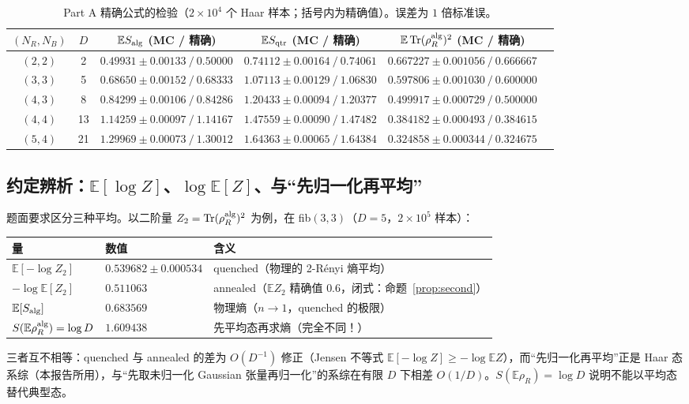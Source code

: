 \documentclass[11pt,a4paper]{ctexart}
\theoremstyle{definition}
\newcommand{\Tr}{\operatorname{Tr}}
\newcommand{\E}{\mathbb{E}}
\newcommand{\Nalg}{S_{\rm alg}}
\newcommand{\Nqtr}{S_{\rm qtr}}
\begin{document}
\begin{table}[t]\centering
\caption{Part A 精确公式的检验（$2\times10^4$ 个 Haar 样本；括号内为精确值）。误差为 $1$ 倍标准误。}
\label{tab:partA}
\footnotesize\setlength{\tabcolsep}{3pt}
\begin{tabular}{cccccc}
\toprule
$(N_R,N_B)$ & $D$ & $\E\Nalg$ (MC / 精确) & $\E\Nqtr$ (MC / 精确) & $\E\Tr(\rho_R^{\rm alg})^2$ (MC / 精确)\\
\midrule
$(2,2)$ & 2 & $0.49931\pm0.00133\ /\ 0.50000$ & $0.74112\pm0.00164\ /\ 0.74061$ & $0.667227\pm0.001056\ /\ 0.666667$\\
$(3,3)$ & 5 & $0.68650\pm0.00152\ /\ 0.68333$ & $1.07113\pm0.00129\ /\ 1.06830$ & $0.597806\pm0.001030\ /\ 0.600000$\\
$(4,3)$ & 8 & $0.84299\pm0.00106\ /\ 0.84286$ & $1.20433\pm0.00094\ /\ 1.20377$ & $0.499917\pm0.000729\ /\ 0.500000$\\
$(4,4)$ & 13 & $1.14259\pm0.00097\ /\ 1.14167$ & $1.47559\pm0.00090\ /\ 1.47482$ & $0.384182\pm0.000493\ /\ 0.384615$\\
$(5,4)$ & 21 & $1.29969\pm0.00073\ /\ 1.30012$ & $1.64363\pm0.00065\ /\ 1.64384$ & $0.324858\pm0.000344\ /\ 0.324675$\\
\bottomrule
\end{tabular}
\end{table}

\subsection{约定辨析：$\E[\log Z]$、$\log\E[Z]$、与“先归一化再平均”}

题面要求区分三种平均。以二阶量 $Z_2=\Tr(\rho_R^{\rm alg})^2$ 为例，在 fib$(3,3)$（$D=5$，$2\times10^5$ 样本）：
\begin{center}
\begin{tabular}{lll}
\toprule
量 & 数值 & 含义{}\\
\midrule
$\E[-\log Z_2]$ & $0.539682\pm0.000534$ & quenched（物理的 2-R\'enyi 熵平均）{}\\
$-\log \E[Z_2]$ & $0.511063$ & annealed（$\E Z_2$ 精确值 $0.6$，闭式：命题~\ref{prop:second}）{}\\
$\E[\Nalg]$ & $0.683569$ & 物理熵（$n\to1$，quenched 的极限）{}\\
$S(\E\rho_R^{\rm alg})=\log D$ & $1.609438$ & 先平均态再求熵（完全不同！）{}\\
\bottomrule
\end{tabular}
\end{center}
三者互不相等：quenched 与 annealed 的差为 $O(D^{-1})$ 修正（Jensen 不等式 $\E[-\log Z]\ge-\log\E Z$），而“先归一化再平均”正是 Haar 态系综（本报告所用），与“先取未归一化 Gaussian 张量再归一化”的系综在有限 $D$ 下相差 $O(1/D)$。$S(\E\rho_R)=\log D$ 说明不能以平均态替代典型态。
\end{document}
